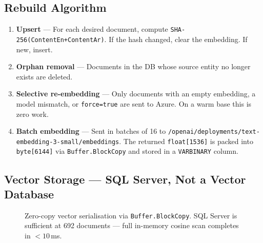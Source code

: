 \documentclass[11pt,a4paper]{article}
\begin{document}
\subsection{Rebuild Algorithm}

\begin{enumerate}
  \item \textbf{Upsert} --- For each desired document, compute \texttt{SHA-256(ContentEn+ContentAr)}.
    If the hash changed, clear the embedding. If new, insert.
  \item \textbf{Orphan removal} --- Documents in the DB whose source entity no longer
    exists are deleted.
  \item \textbf{Selective re-embedding} --- Only documents with an empty embedding, a
    model mismatch, or \texttt{force=true} are sent to Azure. On a warm base this is
    zero work.
  \item \textbf{Batch embedding} --- Sent in batches of 16 to
    \texttt{/openai/deployments/text-embedding-3-small/embeddings}.
    The returned \texttt{float[1536]} is packed into \texttt{byte[6144]}
    via \texttt{Buffer.BlockCopy} and stored in a \texttt{VARBINARY} column.
\end{enumerate}

\subsection{Vector Storage --- SQL Server, Not a Vector Database}

\begin{figure}[H]
\centering
{}
\caption{Zero-copy vector serialisation via \texttt{Buffer.BlockCopy}. SQL Server is
  sufficient at 692 documents --- full in-memory cosine scan completes in $<10$\,ms.}
\end{figure}
\end{document}
